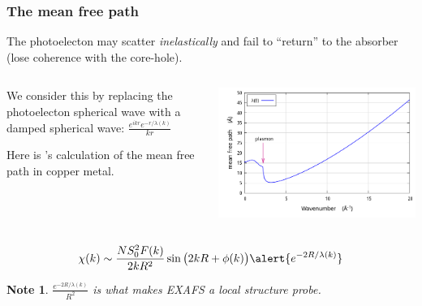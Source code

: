 \documentclass[10pt, xcolor=x11names, compress]{beamer}
\newtheorem{notethis}[theorem]{Note}
\begin{document}
\begin{frame}
  \frametitle{The mean free path}
  The photoelecton may scatter \textit{inelastically} and fail to
  ``return'' to the absorber (lose coherence with the core-hole).

  \medskip

  \begin{columns}
    \begin{column}{0.5\linewidth}
      We consider this by replacing the photoelecton spherical wave
      with a damped spherical wave:
      $\frac{e^{ikr}e^{-r/\lambda(k)}}{kr}$

      \medskip

      Here is {\feff}'s calculation of the mean free path in copper
      metal.
    \end{column}
    \begin{column}{0.5\linewidth}
      \includegraphics[width=\linewidth]{images/mfp.png}
    \end{column}
  \end{columns}
  \begin{equation}
    \chi(k) \sim \frac{NS_0^2F(k)}{2kR^2}\sin\big(2kR+\phi(k)\big)
    \alert{e^{-2R/\lambda(k)}}
    \notag
  \end{equation}
  \begin{notethis}
    $\frac{e^{-2R/\lambda(k)}}{R^2}$ is what makes EXAFS a \alert{local}
    structure probe.
  \end{notethis}
\end{frame}
\end{document}
